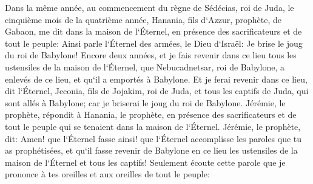 \verse Dans la même année, au commencement du règne de Sédécias, roi de Juda, le cinquième mois de la quatrième année, Hanania, fils d`Azzur, prophète, de Gabaon, me dit dans la maison de l`Éternel, en présence des sacrificateurs et de tout le peuple: 
\verse Ainsi parle l`Éternel des armées, le Dieu d`Israël: Je brise le joug du roi de Babylone! 
\verse Encore deux années, et je fais revenir dans ce lieu tous les ustensiles de la maison de l`Éternel, que Nebucadnetsar, roi de Babylone, a enlevés de ce lieu, et qu`il a emportés à Babylone. 
\verse Et je ferai revenir dans ce lieu, dit l`Éternel, Jeconia, fils de Jojakim, roi de Juda, et tous les captifs de Juda, qui sont allés à Babylone; car je briserai le joug du roi de Babylone. 
\verse Jérémie, le prophète, répondit à Hanania, le prophète, en présence des sacrificateurs et de tout le peuple qui se tenaient dans la maison de l`Éternel. 
\verse Jérémie, le prophète, dit: Amen! que l`Éternel fasse ainsi! que l`Éternel accomplisse les paroles que tu as prophétisées, et qu`il fasse revenir de Babylone en ce lieu les ustensiles de la maison de l`Éternel et tous les captifs! 
\verse Seulement écoute cette parole que je prononce à tes oreilles et aux oreilles de tout le peuple: 
